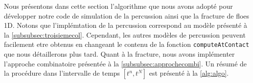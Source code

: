 Nous présentons dans cette section l'algorithme que nous avons adopté pour développer notre code de simulation de la percussion ainsi que la fracture de floes 1D. Notons que l'implémtation de la percussion correspond au modèle présenté à la \cref{subsubsec:troisiemecol}. Cependant, les autres modèles de percussion peuvent facilement etre obtenus en changeant le contenu de la fonction \texttt{computeAtContact} que nous détaillerons plus tard. Quant à la fracture, nous avons implémenter l'approche combinatoire présentée à la \cref{subsubsec:approchecombi}. Un résumé de la procédure dans l'intervalle de temps $[t^n, t^{N}]$ est présenté à la \cref{alg:algo}.
